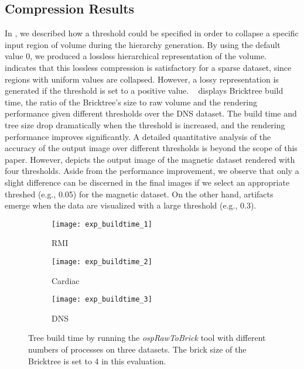 \subsection{Compression Results}
In , we described how a threshold could be specified 
in order to collapse a specific input region of volume during the hierarchy generation.
By using the default value 0, we produced a lossless hierarchical representation of
the volume.  indicates that this lossless compression
is satisfactory for a sparse dataset, since regions with uniform values
are collapsed. However, a lossy representation is generated if the threshold is
set to a positive value. ~ displays Bricktree build time,
the ratio of the Bricktree's size to raw volume and the rendering performance given different 
thresholds over the DNS dataset. The build time and tree size drop dramatically when 
the threshold is increased, and the rendering performance improves significantly. 
A detailed quantitative analysis of the accuracy of the output image over different 
thresholds is beyond the scope of this paper.
However, 
depicts the output image of the magnetic dataset rendered with four thresholds. Aside from the performance improvement, 
we observe that only a slight difference can be discerned in the final images if we select an appropriate threshed (e.g., 0.05) for the magnetic dataset.
On the other hand, artifacts emerge when the data are visualized with a large threshold (e.g., 0.3).

\begin{figure}[h]
    \centering
    \begin{subfigure}[b]{0.32\columnwidth}
        \texttt{[image: exp\_buildtime\_1]}
        \vspace{-1.5em}
        \caption{RMI}
        \label{fig:exp_buildtime_1}
    \end{subfigure}
    \begin{subfigure}[b]{0.32\columnwidth}
        \texttt{[image: exp\_buildtime\_2]}
        \vspace{-1.5em}
        \caption{Cardiac}
        \label{fig:exp_buildtime_2}
    \end{subfigure}
    \begin{subfigure}[b]{0.32\columnwidth}
        \texttt{[image: exp\_buildtime\_3]}
        \vspace{-1.5em}
        \caption{DNS}
        \label{fig:exp_buildtime_3}
    \end{subfigure}
   
	\caption{\label{fig:exp_buildtime}%
	Tree build time by running the \textit{ospRawToBrick} tool with different numbers of processes on three datasets. The brick size of the Bricktree is set to 4 in this evaluation.}
	\vspace{-1em}
\end{figure}

